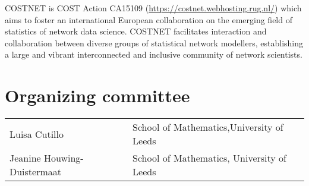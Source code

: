 COSTNET is COST Action CA15109 (\url{https://costnet.webhosting.rug.nl/}) which aims to foster an international European collaboration on the emerging field of statistics of network data science. COSTNET facilitates interaction and collaboration between diverse groups of statistical network modellers, establishing a large and vibrant interconnected and inclusive community of network scientists. 



\section{Organizing committee}
\begin{center}
\begin{tabular}{ll}
Luisa Cutillo & School of Mathematics,University of Leeds\\
Jeanine Houwing-Duistermaat & School of Mathematics, University of Leeds


\end{tabular}
\end{center}